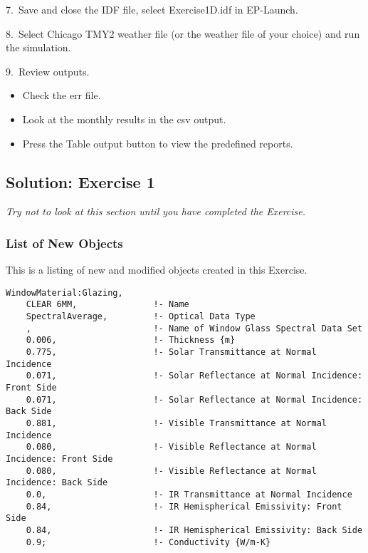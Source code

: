 7.~Save and close the IDF file, select Exercise1D.idf in EP-Launch.

8.~Select Chicago TMY2 weather file (or the weather file of your choice) and run the simulation.

9.~Review outputs.

\begin{itemize}
\item
  Check the err file.
\item
  Look at the monthly results in the csv output.
\item
  Press the Table output button to view the predefined reports.
\end{itemize}

\subsection{Solution: Exercise 1}\label{solution-exercise-1}

\emph{Try not to look at this section until you have completed the Exercise.}

\subsubsection{List of New Objects}\label{list-of-new-objects}

This is a listing of new and modified objects created in this Exercise.

\begin{lstlisting}
WindowMaterial:Glazing,
    CLEAR 6MM,               !- Name
    SpectralAverage,         !- Optical Data Type
    ,                        !- Name of Window Glass Spectral Data Set
    0.006,                   !- Thickness {m}
    0.775,                   !- Solar Transmittance at Normal Incidence
    0.071,                   !- Solar Reflectance at Normal Incidence: Front Side
    0.071,                   !- Solar Reflectance at Normal Incidence: Back Side
    0.881,                   !- Visible Transmittance at Normal Incidence
    0.080,                   !- Visible Reflectance at Normal Incidence: Front Side
    0.080,                   !- Visible Reflectance at Normal Incidence: Back Side
    0.0,                     !- IR Transmittance at Normal Incidence
    0.84,                    !- IR Hemispherical Emissivity: Front Side
    0.84,                    !- IR Hemispherical Emissivity: Back Side
    0.9;                     !- Conductivity {W/m-K}
\end{lstlisting}

